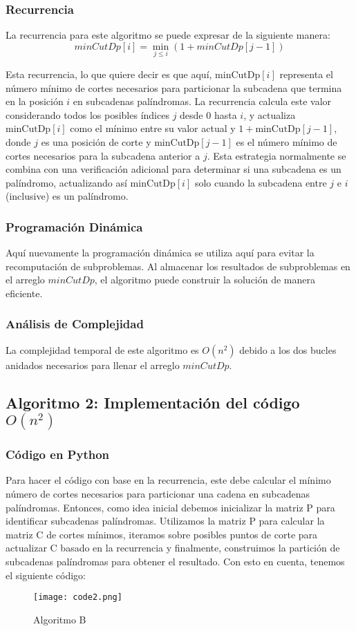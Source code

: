 \documentclass{report}
\begin{document}
\subsubsection{Recurrencia}
La recurrencia para este algoritmo se puede expresar de la siguiente manera:
\[
minCutDp[i] = \min_{j \leq i} (1 + minCutDp[j-1])
\]

Esta recurrencia, lo que quiere decir es que aquí, \(\text{minCutDp}[i]\) representa el número mínimo de cortes necesarios para particionar la subcadena que termina en la posición \(i\) en subcadenas palíndromas. La recurrencia calcula este valor considerando todos los posibles índices \(j\) desde \(0\) hasta \(i\), y actualiza \(\text{minCutDp}[i]\) como el mínimo entre su valor actual y \(1 + \text{minCutDp}[j - 1]\), donde \(j\) es una posición de corte y \(\text{minCutDp}[j - 1]\) es el número mínimo de cortes necesarios para la subcadena anterior a \(j\). Esta estrategia normalmente se combina con una verificación adicional para determinar si una subcadena es un palíndromo, actualizando así \(\text{minCutDp}[i]\) solo cuando la subcadena entre \(j\) e \(i\) (inclusive) es un palíndromo.

\subsubsection{Programación Dinámica}
Aquí nuevamente la programación dinámica se utiliza aquí para evitar la recomputación de subproblemas. Al almacenar los resultados de subproblemas en el arreglo $minCutDp$, el algoritmo puede construir la solución de manera eficiente.

\subsubsection{Análisis de Complejidad}
La complejidad temporal de este algoritmo es $O(n^2)$ debido a los dos bucles anidados necesarios para llenar el arreglo $minCutDp$.

\subsection{Algoritmo 2: Implementación del código $O(n^2)$}
\subsubsection{Código en Python}
Para hacer el código con base en la recurrencia, este debe calcular el mínimo número de cortes necesarios para particionar una cadena en subcadenas palíndromas. Entonces, como idea inicial debemos inicializar la matriz P para identificar subcadenas palíndromas.
Utilizamos la matriz P para calcular la matriz C de cortes mínimos, iteramos sobre posibles puntos de corte para actualizar C basado en la recurrencia y finalmente, construimos la partición de subcadenas palíndromas para obtener el resultado. Con esto en cuenta, tenemos el siguiente código:
\begin{figure}[htb]
\centering
\texttt{[image: code2.png]}
\caption{Algoritmo B}
\label{fig:tigre}
\end{figure}
\newpage
\end{document}
